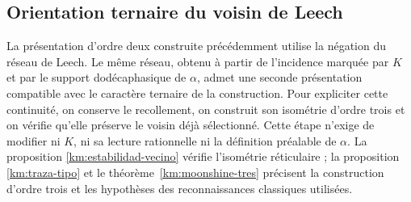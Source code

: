 
\subsection{Orientation ternaire du voisin de Leech}
\label{km:orden-tres-reticular}

La présentation d’ordre deux construite précédemment utilise la négation
du réseau de Leech. Le même réseau, obtenu à partir de l’incidence marquée
par \(K\) et par le support dodécaphasique de \(\alpha\), admet une seconde
présentation compatible avec le caractère ternaire de la construction.
Pour expliciter cette continuité, on conserve le recollement, on construit
son isométrie d’ordre trois et on vérifie qu’elle préserve le voisin déjà
sélectionné. Cette étape n’exige de modifier ni \(K\), ni sa lecture rationnelle ni
la définition préalable de \(\alpha\). La proposition
\ref{km:estabilidad-vecino} vérifie l’isométrie réticulaire ; la proposition
\ref{km:traza-tipo} et le théorème~\ref{km:moonshine-tres} précisent la construction
d’ordre trois et les hypothèses des reconnaissances classiques utilisées.

